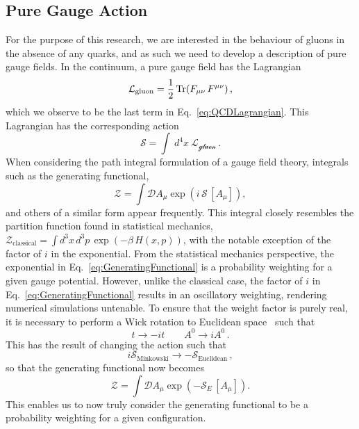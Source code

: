\subsection{Pure Gauge Action}
For the purpose of this research, we are interested in the behaviour of gluons in the absence of any quarks, and as such we need to develop a description of pure gauge fields. In the continuum, a pure gauge field has the Lagrangian~\cite{ryder1996quantum}
%
\begin{equation}
\mathcal{L}_{\text{gluon}}=\frac{1}{2}\operatorname{Tr}(F_{\mu\nu}\,F^{\mu\nu})\, ,
\label{eq:GaugeLagrangian}
\end{equation}
%
which we observe to be the last term in Eq.~\eqref{eq:QCDLagrangian}. This Lagrangian has the corresponding action
%
\begin{equation}
\mathcal{S}=\int~d^4x~\mathcal{L_\text{gluon}}\, .
\label{eq:QCDAction}
\end{equation}
%
When considering the path integral formulation of a gauge field theory, integrals such as the generating functional,
%
\begin{equation}
\mathcal{Z} =\int \mathcal{D} A_\mu \exp\left(i\,\mathcal{S}\,[A_\mu]\right),
\label{eq:GeneratingFunctional}
\end{equation}
%
and others of a similar form appear frequently. This integral closely resembles the partition function found in statistical mechanics, $\mathcal{Z}_{\text{classical}}=\int d^3x\,d^3p\,\exp\left(-\beta\,H(x,p)\right)$, with the notable exception of the factor of $i$ in the exponential. From the statistical mechanics perspective, the exponential in Eq.~\eqref{eq:GeneratingFunctional} is a probability weighting for a given gauge potential. However, unlike the classical case, the factor of $i$ in Eq.~\eqref{eq:GeneratingFunctional} results in an oscillatory weighting, rendering numerical simulations untenable. To ensure that the weight factor is purely real, it is necessary to perform a Wick rotation to Euclidean space~\cite{Schafer:1996wv,Wilson:1974sk} such that
\begin{equation}
t \rightarrow -it \qquad A^0 \rightarrow iA^0\, .
\end{equation}
%
This has the result of changing the action such that
%
\begin{equation}
i\mathcal{S}_\text{Minkowski} \rightarrow -\mathcal{S}_\text{Euclidean}\, ,
\end{equation} 
so that the generating functional now becomes 
%
\begin{equation}
\mathcal{Z}=\int \mathcal{D} A_\mu \exp\left(-\mathcal{S}_E\,[A_\mu]\right).
\end{equation}
%
This enables us to now truly consider the generating functional to be a probability weighting for a given configuration.\\


